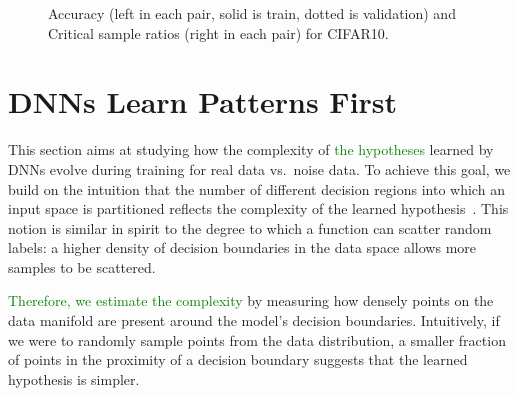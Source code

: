 \documentclass{article}
\newcommand{\af}[1]{\textcolor{green}{#1}}
\newcommand{\af}[1]{\textcolor{black}{#1}}
\begin{document}
        \begin{figure*}[!t]
		\center
		\hspace{0.3mm}
		\caption{Accuracy (left in each pair, solid is train, dotted is validation) and Critical sample ratios (right in each pair) for CIFAR10.}
	
    \label{fig:cifar_nicolas}
	\end{figure*}





\section{DNNs Learn Patterns First}
\label{sec:simple_patterns_first}
This section aims at studying how the complexity of \af{the hypotheses} learned by DNNs evolve during training for real data vs.~noise data. 
To achieve this goal, we build on the intuition that the number of different decision regions into which an input space is partitioned reflects the complexity of the learned hypothesis~\citep{sokolic2016robust}. 
This notion is similar in spirit to the degree to which a function can scatter random labels: a higher density of decision boundaries in the data space allows more samples to be scattered.

\af{Therefore, we estimate the complexity} by measuring how densely points on the data manifold are present around the model's decision boundaries. 
Intuitively, if we were to randomly sample points from the data distribution, a smaller fraction of points in the proximity of a decision boundary suggests that the learned hypothesis is simpler.
\end{document}
